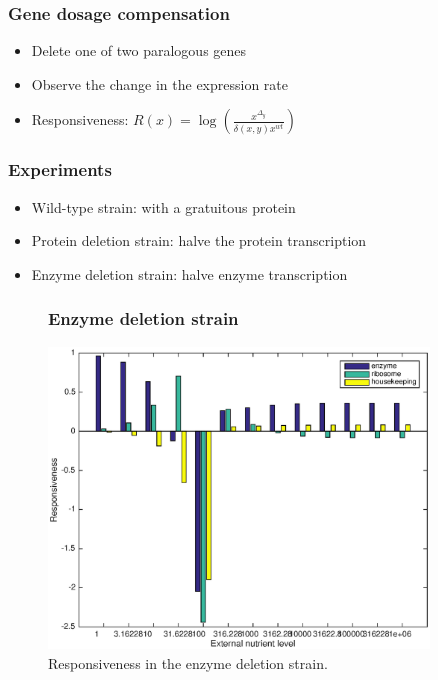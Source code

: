 \documentclass{beamer}
\begin{document}
\begin{frame}
\frametitle{Gene dosage compensation}
\begin{itemize}
\item	Delete one of two paralogous genes
\item Observe the change in the expression rate
\item Responsiveness: $R(x) = \log(\frac{x^{\Delta_y}}{\delta(x,y)x^{wt}})$ 
\end{itemize}
\end{frame}

\begin{frame}
\frametitle{Experiments}
\begin{itemize}
\item Wild-type strain: with a gratuitous protein
\item Protein deletion strain: halve the protein transcription
\item Enzyme deletion strain: halve enzyme transcription
\end{itemize}
\end{frame}

\begin{frame}
\begin{figure}
\frametitle{Enzyme deletion strain}
\includegraphics[width=0.9\textwidth]{enzdel.eps}
\caption{Responsiveness in the enzyme deletion strain.}
\end{figure}
\end{frame}
\end{document}
